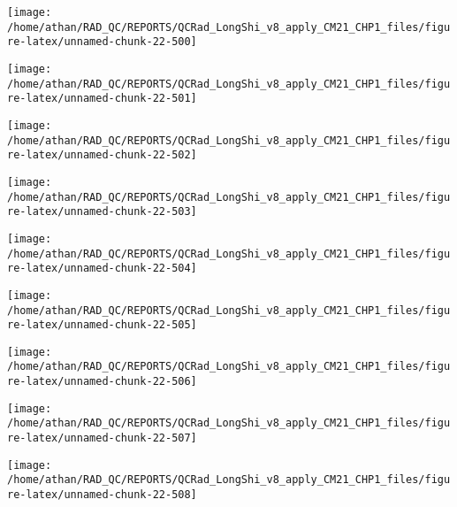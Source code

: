 \documentclass[
  10pt,
  a4paper,oneside]{article}
\begin{document}
\begin{center}\texttt{[image: /home/athan/RAD\_QC/REPORTS/QCRad\_LongShi\_v8\_apply\_CM21\_CHP1\_files/figure-latex/unnamed-chunk-22-500]} \end{center}

\begin{center}\texttt{[image: /home/athan/RAD\_QC/REPORTS/QCRad\_LongShi\_v8\_apply\_CM21\_CHP1\_files/figure-latex/unnamed-chunk-22-501]} \end{center}

\begin{center}\texttt{[image: /home/athan/RAD\_QC/REPORTS/QCRad\_LongShi\_v8\_apply\_CM21\_CHP1\_files/figure-latex/unnamed-chunk-22-502]} \end{center}

\begin{center}\texttt{[image: /home/athan/RAD\_QC/REPORTS/QCRad\_LongShi\_v8\_apply\_CM21\_CHP1\_files/figure-latex/unnamed-chunk-22-503]} \end{center}

\begin{center}\texttt{[image: /home/athan/RAD\_QC/REPORTS/QCRad\_LongShi\_v8\_apply\_CM21\_CHP1\_files/figure-latex/unnamed-chunk-22-504]} \end{center}

\begin{center}\texttt{[image: /home/athan/RAD\_QC/REPORTS/QCRad\_LongShi\_v8\_apply\_CM21\_CHP1\_files/figure-latex/unnamed-chunk-22-505]} \end{center}

\begin{center}\texttt{[image: /home/athan/RAD\_QC/REPORTS/QCRad\_LongShi\_v8\_apply\_CM21\_CHP1\_files/figure-latex/unnamed-chunk-22-506]} \end{center}

\begin{center}\texttt{[image: /home/athan/RAD\_QC/REPORTS/QCRad\_LongShi\_v8\_apply\_CM21\_CHP1\_files/figure-latex/unnamed-chunk-22-507]} \end{center}

\begin{center}\texttt{[image: /home/athan/RAD\_QC/REPORTS/QCRad\_LongShi\_v8\_apply\_CM21\_CHP1\_files/figure-latex/unnamed-chunk-22-508]} \end{center}
\end{document}
